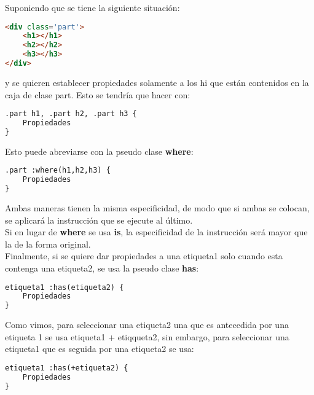 \documentclass[10pt,oneside]{article}
\begin{document}
\begin{multicols}{2}
    Suponiendo que se tiene la siguiente situación:

    \begin{lstlisting}[language=HTML]
<div class='part'>
    <h1></h1>
    <h2></h2>
    <h3></h3>
</div>
    \end{lstlisting}

    y se quieren establecer propiedades solamente a los hi que están contenidos en la caja de clase part. Esto se tendría que hacer con:

    \begin{lstlisting}[language=HTML]
.part h1, .part h2, .part h3 {
    Propiedades 
}
    \end{lstlisting}

    Esto puede abreviarse con la pseudo clase \textbf{where}:
    
    \begin{lstlisting}[language=HTML]
.part :where(h1,h2,h3) {
    Propiedades 
}
    \end{lstlisting}

    Ambas maneras tienen la misma especificidad, de modo que si ambas se colocan, se aplicará la instrucción que se ejecute al último.\\ \newline Si en lugar de \textbf{where} se usa \textbf{is}, la especificidad de la instrucción será mayor que la de la forma original. \\ \newline Finalmente, si se quiere dar propiedades a una etiqueta1 solo cuando esta contenga una etiqueta2, se usa la pseudo clase \textbf{has}:

    \begin{lstlisting}[language=HTML]
etiqueta1 :has(etiqueta2) {
    Propiedades 
}
    \end{lstlisting}

    Como vimos, para seleccionar una etiqueta2 una que es antecedida por una etiqueta 1 se usa etiqueta1 + etiqqueta2, sin embargo, para seleccionar una etiqueta1 que es seguida por una etiqueta2 se usa:
    
    \begin{lstlisting}[language=HTML]
etiqueta1 :has(+etiqueta2) {
    Propiedades 
}
    \end{lstlisting}


\end{multicols}
\end{document}
